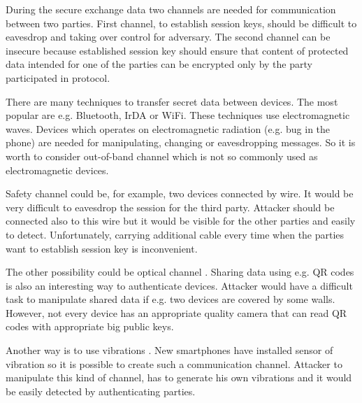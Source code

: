 \documentclass[11pt,titlepage]{article}
\theoremstyle{plain}
\begin{document}
\vspace{5mm}

During the secure exchange data two channels are needed for communication between two parties. First channel, to establish session keys, should be difficult to eavesdrop and taking over control for adversary. The second channel can be insecure because established session key should ensure that content of protected data intended for one of the parties can be encrypted only by the party participated in protocol. 


There are many techniques to transfer secret data between devices. The most popular are e.g. Bluetooth, IrDA or WiFi. These techniques use electromagnetic waves. Devices which operates on electromagnetic radiation (e.g. bug in the phone) are needed for manipulating, changing or eavesdropping messages. So it is worth to consider out-of-band channel which is not so commonly used as electromagnetic devices.

\vspace{5mm}

Safety channel could be, for example, two devices connected by wire. It would be very difficult to eavesdrop the session for the third party. Attacker should be connected also to this wire but it would be visible for the other parties and easily to detect. Unfortunately, carrying additional cable every time when the parties want to establish session key is inconvenient.

\vspace{5mm}

The other possibility could be optical channel \cite{QRcode}. Sharing data using e.g. QR codes is also an interesting way to authenticate devices. Attacker would have a difficult task to manipulate shared data if e.g. two devices are covered by some walls. However, not every device has an appropriate quality camera that can read QR codes with appropriate big public keys.

\vspace{5mm}

Another way is to use vibrations \cite{vibrat}. New smartphones have installed sensor of vibration so it is possible to create such a communication channel. Attacker to manipulate this kind of channel, has to generate his own vibrations and it would be easily detected by authenticating parties.
\end{document}

